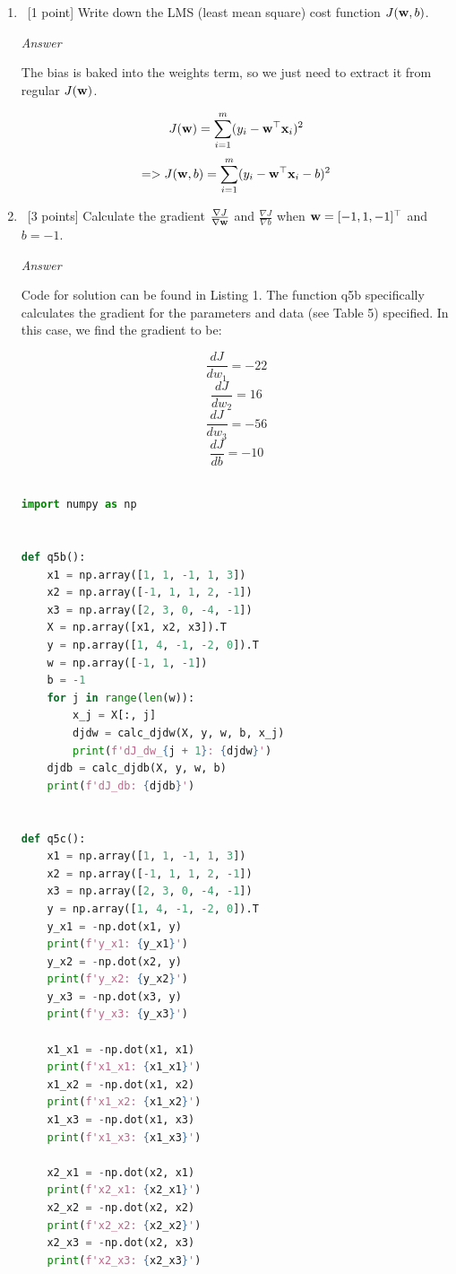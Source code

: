 \documentclass[12pt, fullpage,letterpaper]{article}
\begin{document}
\begin{enumerate}
\begin{enumerate}
	\item~[1 point] Write down the LMS (least mean square) cost function $J({\bf w}, b)$.
	
	\emph{Answer}
	
	The bias is baked into the weights term, so we just need to extract it from regular $J({\bf w})$.
	
	\[
	    J({\bf w}) = \sum_{i=1}^m (y_i - {\bf w}^\top {\bf x}_i)^2
	\]
	\[
	    => J({\bf w}, b) = \sum_{i=1}^m (y_i - {\bf w}^\top {\bf x}_i - b)^2
	\]
	
	\item~[3 points] Calculate the gradient $\frac{\nabla J}{\nabla {\bf w}}$ and $\frac{\nabla J}{\nabla b}$ when ${\bf w} = [-1,1,-1]^\top$ and $b = -1$.
	
	\emph{Answer}
	
	Code for solution can be found in Listing 1. The function q5b specifically calculates the gradient for the parameters and data (see Table 5) specified. In this case, we find the gradient to be:
	
	\[
	\frac{dJ}{dw_1} = -22
	\]
	\[
    \frac{dJ}{dw_2} = 16
    \]
    \[
    \frac{dJ}{dw_3} = -56
    \]
    \[
    \frac{dJ}{db} = -10
    \]
	
	\begin{lstlisting}[language=Python, caption=QuestionAnswers.part1]

import numpy as np


def q5b():
    x1 = np.array([1, 1, -1, 1, 3])
    x2 = np.array([-1, 1, 1, 2, -1])
    x3 = np.array([2, 3, 0, -4, -1])
    X = np.array([x1, x2, x3]).T
    y = np.array([1, 4, -1, -2, 0]).T
    w = np.array([-1, 1, -1])
    b = -1
    for j in range(len(w)):
        x_j = X[:, j]
        djdw = calc_djdw(X, y, w, b, x_j)
        print(f'dJ_dw_{j + 1}: {djdw}')
    djdb = calc_djdb(X, y, w, b)
    print(f'dJ_db: {djdb}')


def q5c():
    x1 = np.array([1, 1, -1, 1, 3])
    x2 = np.array([-1, 1, 1, 2, -1])
    x3 = np.array([2, 3, 0, -4, -1])
    y = np.array([1, 4, -1, -2, 0]).T
    y_x1 = -np.dot(x1, y)
    print(f'y_x1: {y_x1}')
    y_x2 = -np.dot(x2, y)
    print(f'y_x2: {y_x2}')
    y_x3 = -np.dot(x3, y)
    print(f'y_x3: {y_x3}')
    
    x1_x1 = -np.dot(x1, x1)
    print(f'x1_x1: {x1_x1}')
    x1_x2 = -np.dot(x1, x2)
    print(f'x1_x2: {x1_x2}')
    x1_x3 = -np.dot(x1, x3)
    print(f'x1_x3: {x1_x3}')

    x2_x1 = -np.dot(x2, x1)
    print(f'x2_x1: {x2_x1}')
    x2_x2 = -np.dot(x2, x2)
    print(f'x2_x2: {x2_x2}')
    x2_x3 = -np.dot(x2, x3)
    print(f'x2_x3: {x2_x3}')


\end{lstlisting}
\end{enumerate}
\end{enumerate}
\end{document}
